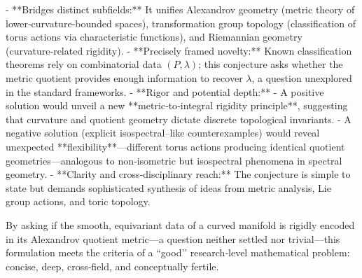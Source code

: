- **Bridges distinct subfields:** It unifies Alexandrov geometry (metric theory of lower‑curvature‑bounded spaces), transformation group topology (classification of torus actions via characteristic functions), and Riemannian geometry (curvature‑related rigidity).  
- **Precisely framed novelty:** Known classification theorems rely on combinatorial data \((P, \lambda)\); this conjecture asks whether the metric quotient provides enough information to recover \(\lambda\), a question unexplored in the standard frameworks.  
- **Rigor and potential depth:**  
  - A positive solution would unveil a new **metric‑to‑integral rigidity principle**, suggesting that curvature and quotient geometry dictate discrete topological invariants.  
  - A negative solution (explicit isospectral–like counterexamples) would reveal unexpected **flexibility**—different torus actions producing identical quotient geometries—analogous to non‑isometric but isospectral phenomena in spectral geometry.  
- **Clarity and cross‑disciplinary reach:** The conjecture is simple to state but demands sophisticated synthesis of ideas from metric analysis, Lie group actions, and toric topology.

By asking if the smooth, equivariant data of a curved manifold is rigidly encoded in its Alexandrov quotient metric—a question neither settled nor trivial—this formulation meets the criteria of a “good’’ research‑level mathematical problem: concise, deep, cross‑field, and conceptually fertile.
